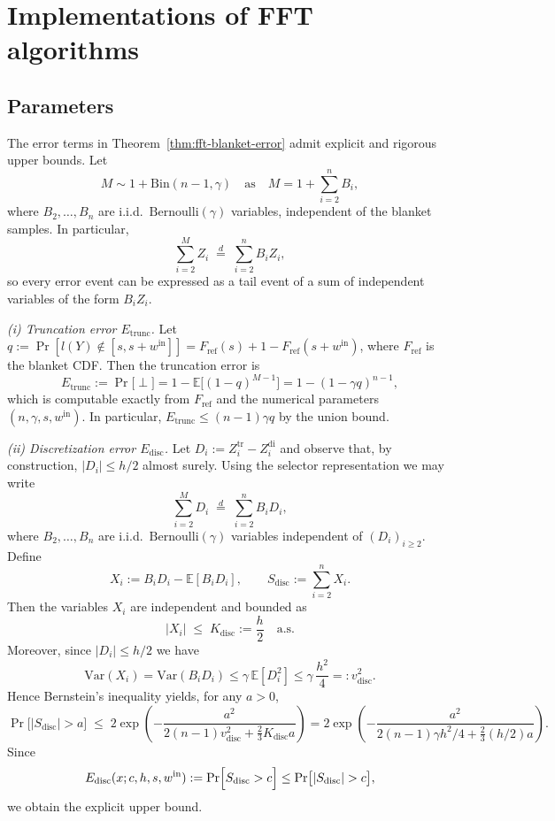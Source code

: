 \documentclass{article}
\theoremstyle{plain}
\theoremstyle{definition}
\begin{document}
\section{Implementations of FFT algorithms}
\label{sec:fft-implementation-details}


\subsection{Parameters}

\label{sec:fft-parameter-selection}
The error terms in Theorem~\ref{thm:fft-blanket-error} admit explicit and
rigorous upper bounds.
Let 
\[
  M \sim 1 + \mathrm{Bin}(n-1,\gamma)
  \quad\text{as}\quad
  M = 1 + \sum_{i=2}^n B_i,
\]
where $B_2,\dots,B_n$ are i.i.d.\ $\mathrm{Bernoulli}(\gamma)$ variables,
independent of the blanket samples. In particular,
\[
  \sum_{i=2}^M Z_i
  \;\stackrel{d}{=}\;
  \sum_{i=2}^n B_i Z_i,
\]
so every error event can be expressed as a tail event of a sum of independent variables of the form $B_i Z_i$.

\smallskip

\emph{(i) Truncation error $E_{\mathrm{trunc}}$.}
Let $q := \Pr[l(Y)\notin[s,s+w^{\mathrm{in}}]] =
F_{\mathrm {ref}}(s) + 1 - F_{\mathrm {ref}}(s+w^{\mathrm{in}})$, where
$F_{\mathrm {ref}}$ is the blanket CDF. Then the truncation error is
\[
  E_{\mathrm{trunc}}
  :=
  \Pr\bigl[\perp\bigr]
  =
  1 - \mathbb E\bigl[(1-q)^{M-1}\bigr]
  =
  1 - (1-\gamma q)^{n-1},
\]
which is computable exactly from $F_{\mathrm {ref}}$ and the numerical
parameters $(n,\gamma,s,w^{\mathrm{in}})$. In particular,
$E_{\mathrm{trunc}}\le (n-1)\gamma q$ by the union bound.

\smallskip

\emph{(ii) Discretization error $E_{\mathrm{disc}}$.}
Let $D_i := Z_i^{\mathrm{tr}} - Z_i^{\mathrm{di}}$ and observe that,
by construction, $|D_i|\le h/2$ almost surely. Using the selector
representation we may write
\[
  \sum_{i=2}^M D_i
  \;\stackrel{d}{=}\;
  \sum_{i=2}^n B_i D_i,
\]
where $B_2,\dots,B_n$ are i.i.d.\ $\mathrm{Bernoulli}(\gamma)$
variables independent of $(D_i)_{i\ge2}$. Define
\[
  X_i := B_i D_i - \mathbb E[B_i D_i],\qquad
  S_{\mathrm{disc}} := \sum_{i=2}^n X_i.
\]
Then the variables $X_i$ are independent and bounded as
\[
  |X_i|
  \;\le\;
  K_{\mathrm{disc}} := \frac{h}{2}
  \quad\text{a.s.}
\]
Moreover, since $|D_i|\le h/2$ we have
\[
  \mathrm{Var}(X_i)
  = \mathrm{Var}(B_i D_i)
  \le \gamma\,\mathbb E[D_i^2]
  \le \gamma\,\frac{h^2}{4}
  =: v_{\mathrm{disc}}^2.
\]
Hence Bernstein's inequality yields, for any $a>0$,
\[
  \Pr\bigl[|S_{\mathrm{disc}}|>a\bigr]
  \;\le\;
  2\exp\!\left(
    -\frac{a^2}{
      2(n-1)v_{\mathrm{disc}}^2
      + \frac{2}{3}K_{\mathrm{disc}} a
    }
  \right)
  =
  2\exp\!\left(
    -\frac{a^2}{
      2(n-1)\gamma h^2/4
      + \frac{2}{3}(h/2)a
    }
  \right).
\]
Since
\[
  E_{\mathrm{disc}}(x;c,h,s,w^{\mathrm{in}})
  :=
  \Pr\Bigl[
    S_{\mathrm{disc}} > c
  \Bigr]
  \leq
  \Pr\bigl[|S_{\mathrm{disc}}|>c\bigr],
\]
we obtain the explicit upper bound.
\end{document}

